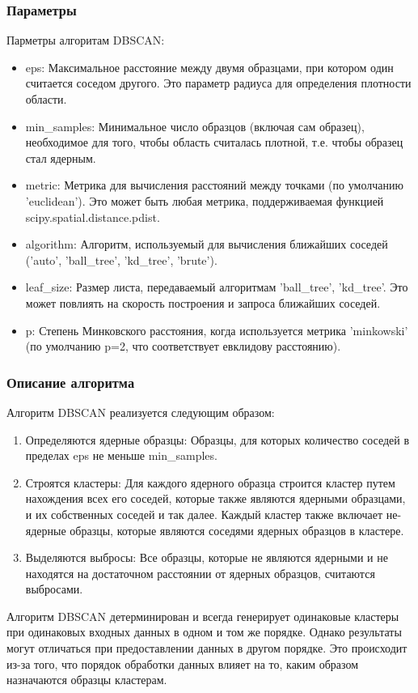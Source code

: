 		\subsubsection{Параметры}
			Парметры алгоритам DBSCAN:
			\begin{itemize}
				\item eps: Максимальное расстояние между двумя образцами, при котором один считается соседом другого. Это параметр радиуса для определения плотности области.
				\item min\_samples: Минимальное число образцов (включая сам образец), необходимое для того, чтобы область считалась плотной, т.е. чтобы образец стал ядерным.
				\item metric: Метрика для вычисления расстояний между точками (по умолчанию 'euclidean'). Это может быть любая метрика, поддерживаемая функцией scipy.spatial.distance.pdist.
				\item algorithm: Алгоритм, используемый для вычисления ближайших соседей ('auto', 'ball\_tree', 'kd\_tree', 'brute').
				\item leaf\_size: Размер листа, передаваемый алгоритмам 'ball\_tree', 'kd\_tree'. Это может повлиять на скорость построения и запроса ближайших соседей.
				\item p: Степень Минковского расстояния, когда используется метрика 'minkowski' (по умолчанию p=2, что соответствует евклидову расстоянию).	
			\end{itemize}
			
			
		\subsubsection{Описание алгоритма}
			Алгоритм DBSCAN реализуется следующим образом:
			\begin{enumerate}
				\item Определяются ядерные образцы: Образцы, для которых количество соседей в пределах eps не меньше min\_samples.
				\item Строятся кластеры: Для каждого ядерного образца строится кластер путем нахождения всех его соседей, которые также являются ядерными образцами, и их собственных соседей и так далее. Каждый кластер также включает не-ядерные образцы, которые являются соседями ядерных образцов в кластере.
				\item Выделяются выбросы: Все образцы, которые не являются ядерными и не находятся на достаточном расстоянии от ядерных образцов, считаются выбросами.
			\end{enumerate}
			Алгоритм DBSCAN детерминирован и всегда генерирует одинаковые кластеры при одинаковых входных данных в одном и том же порядке. Однако результаты могут отличаться при предоставлении данных в другом порядке. Это происходит из-за того, что порядок обработки данных влияет на то, каким образом назначаются образцы кластерам.
			
